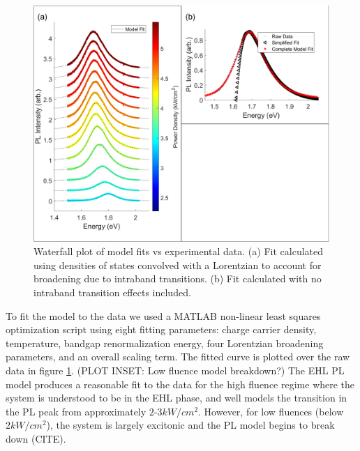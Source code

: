 \documentclass[aps,prl,preprint,superscriptaddress]{revtex4-2}
\begin{document}
\begin{figure}
	\includegraphics[width=1\linewidth]{fig_fitwith&withoutL.png}
	\caption{Waterfall plot of model fits vs experimental data. (a) Fit calculated using densities of states convolved with a Lorentzian to account for broadening due to intraband transitions. (b) Fit calculated with no intraband transition effects included.}
	\label{fig:result_data}
\end{figure}


To fit the model to the data we used a MATLAB non-linear least squares optimization script using eight fitting parameters: charge carrier density, temperature, bandgap renormalization energy, four Lorentzian broadening parameters, and an overall scaling term. The fitted curve is plotted over the raw data in figure \ref{fig:result_data}. (PLOT INSET: Low fluence model breakdown?) The EHL PL model produces a reasonable fit to the data for the high fluence regime where the system is understood to be in the EHL phase, and well models the transition in the PL peak from approximately $2$-$3kW/cm^2$. However, for low fluences (below $2kW/cm^2$), the system is largely excitonic and the PL model begins to break down (CITE).
\end{document}
